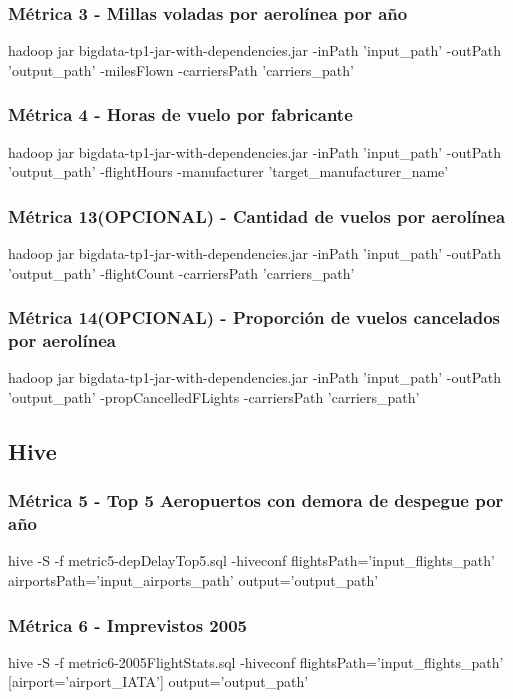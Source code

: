 \documentclass[a4paper,10pt]{article}
\begin{document}
        \subsubsection{Métrica 3 - Millas voladas por aerolínea por año}
            \scriptsize{hadoop jar bigdata-tp1-jar-with-dependencies.jar -inPath 'input\_path' -outPath 'output\_path' -milesFlown -carriersPath 'carriers\_path'}
        \subsubsection{Métrica 4 - Horas de vuelo por fabricante}
            \scriptsize{hadoop jar bigdata-tp1-jar-with-dependencies.jar -inPath 'input\_path' -outPath 'output\_path' -flightHours -manufacturer 'target\_manufacturer\_name'}
       \subsubsection{Métrica 13(OPCIONAL) - Cantidad de vuelos por aerolínea}
            \scriptsize{hadoop jar bigdata-tp1-jar-with-dependencies.jar -inPath 'input\_path' -outPath 'output\_path' -flightCount -carriersPath 'carriers\_path'}
        \subsubsection{Métrica 14(OPCIONAL) - Proporción de vuelos cancelados por aerolínea}
            \scriptsize{hadoop jar bigdata-tp1-jar-with-dependencies.jar -inPath 'input\_path' -outPath 'output\_path' -propCancelledFLights -carriersPath 'carriers\_path'}

    \subsection{Hive}
         \subsubsection{Métrica 5 - Top 5 Aeropuertos con demora de despegue por año}
        \scriptsize{hive -S -f metric5-depDelayTop5.sql -hiveconf flightsPath='input\_flights\_path' airportsPath='input\_airports\_path' output='output\_path'}
        \subsubsection{Métrica 6 - Imprevistos 2005}
        \scriptsize{hive -S -f metric6-2005FlightStats.sql -hiveconf flightsPath='input\_flights\_path' [airport='airport\_IATA'] output='output\_path'}
\end{document}
